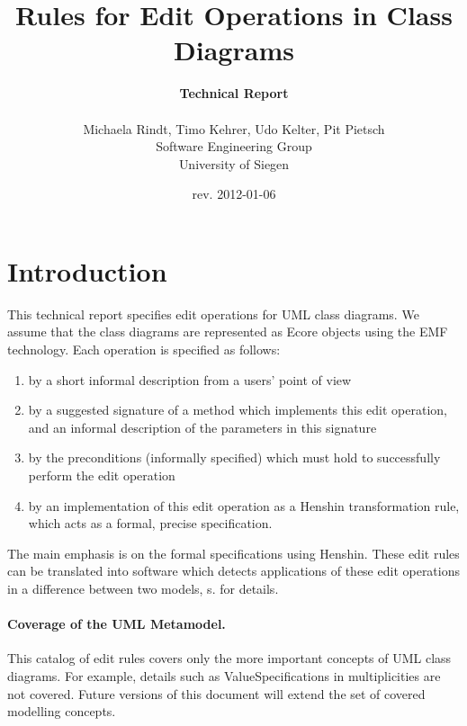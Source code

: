 \documentclass[a4paper,DIV=10]{scrartcl}
\author{\textbf{Technical Report}\\
\hfill\\
Michaela Rindt, Timo Kehrer, Udo Kelter, Pit Pietsch\\
Software Engineering Group\\
University of Siegen}
\title{Rules for Edit Operations in Class Diagrams}
\date{rev. 2012-01-06}
\begin{document}
\maketitle

\newpage
\tableofcontents

\newpage
\section{Introduction}

This technical report specifies edit operations for UML
class diagrams.
 We assume that the class diagrams are represented as
Ecore objects using the EMF technology.
 Each operation is specified as follows:

\begin{enumerate}
\item by a short informal description from a users' point
   of view

\item by a suggested signature of a method which
   implements this edit operation, and an informal
   description of the parameters in this signature

\item by the preconditions (informally specified) which must
   hold to successfully perform the edit operation

\item by an implementation of this edit operation as a
   Henshin transformation rule, which acts as a formal,
   precise specification.

\end{enumerate}

The main emphasis is on the formal specifications using
Henshin. These edit rules can be translated into software
which detects applications of these edit operations in 
a difference between two models, s. \cite{KeKT2011ASE}
for details.


\paragraph{Coverage of the UML Metamodel.} This catalog of
edit rules covers only the more important concepts of UML
class diagrams. For example, details such as
ValueSpecifications in multiplicities are not covered.
Future versions of this document will extend the set of
covered modelling concepts.
\end{document}
